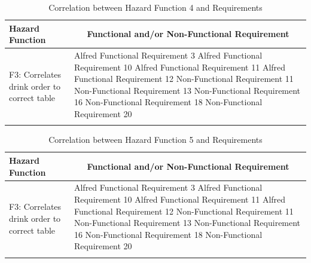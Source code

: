 \documentclass [10pt]{article}
\begin{document}
\begin{longtable}{| p{ } | p{ } |}
\hline 
\centering \textbf{Hazard Function} & 
\multicolumn{1}{c}{\textbf {Functional and/or Non-Functional Requirement}}\\ \hline
\multirow{7}{*}{F3: Correlates drink order to correct table} & 
		{Alfred Functional Requirement 3 \newline
		Alfred Functional Requirement 10 \newline
		Alfred Functional Requirement 11 \newline
		Alfred Functional Requirement 12 \newline
		Non-Functional Requirement 11 \newline
		Non-Functional Requirement 13 \newline
		Non-Functional Requirement 16 \newline
		Non-Functional Requirement 18 \newline
		Non-Functional Requirement 20} \\ 
\hline 
\caption{Correlation between Hazard Function 4 and Requirements}  
\end{longtable}


\begin{longtable}{| p{ } | p{ } |}
\hline 
\centering \textbf{Hazard Function} & 
\multicolumn{1}{c}{\textbf {Functional and/or Non-Functional Requirement}}\\ \hline
\multirow{7}{*}{F3: Correlates drink order to correct table} & 
		{Alfred Functional Requirement 3 \newline
		Alfred Functional Requirement 10 \newline
		Alfred Functional Requirement 11 \newline
		Alfred Functional Requirement 12 \newline
		Non-Functional Requirement 11 \newline
		Non-Functional Requirement 13 \newline
		Non-Functional Requirement 16 \newline
		Non-Functional Requirement 18 \newline
		Non-Functional Requirement 20} \\ 
\hline 
\caption{Correlation between Hazard Function 5 and Requirements}  
\end{longtable}
\end{document}
